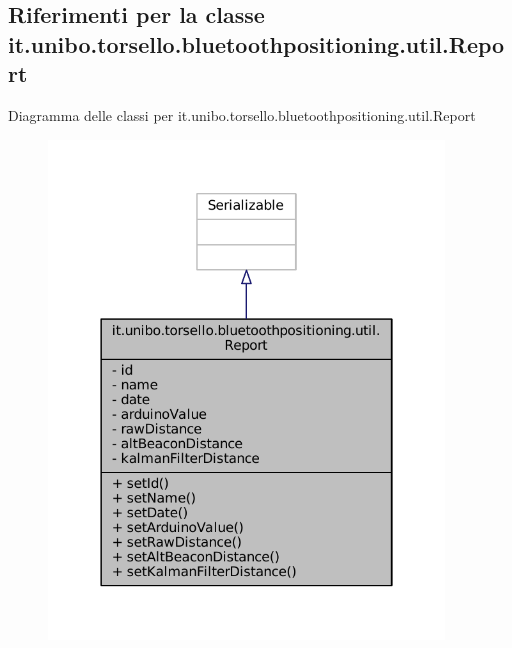 \hypertarget{classit_1_1unibo_1_1torsello_1_1bluetoothpositioning_1_1util_1_1Report}{}\subsection{Riferimenti per la classe it.\+unibo.\+torsello.\+bluetoothpositioning.\+util.\+Report}
\label{classit_1_1unibo_1_1torsello_1_1bluetoothpositioning_1_1util_1_1Report}


Diagramma delle classi per it.\+unibo.\+torsello.\+bluetoothpositioning.\+util.\+Report
\nopagebreak
\begin{figure}[H]
\begin{center}
\leavevmode
\includegraphics[width=298pt]{classit_1_1unibo_1_1torsello_1_1bluetoothpositioning_1_1util_1_1Report__inherit__graph}
\end{center}
\end{figure}


